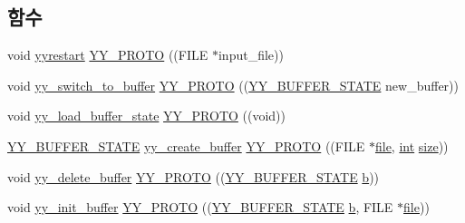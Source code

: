 \subsection*{함수}
\begin{DoxyCompactItemize}
\item 
void \mbox{\hyperlink{expr-lex_8cpp_a3528c58cdd338886f23357f42e2061b8}{yyrestart}} \mbox{\hyperlink{expr-lex_8cpp_ad0030daf8055c0afc233a0c34bc12fd6}{Y\+Y\+\_\+\+P\+R\+O\+TO}} ((F\+I\+LE $\ast$input\+\_\+file))
\item 
void \mbox{\hyperlink{expr-lex_8cpp_a01ffaab94c1633ad975eb2e5d5ca360c}{yy\+\_\+switch\+\_\+to\+\_\+buffer}} \mbox{\hyperlink{expr-lex_8cpp_aa4d8fcf388290ca0a2849fb6120b8bdb}{Y\+Y\+\_\+\+P\+R\+O\+TO}} ((\mbox{\hyperlink{expr-lex_8cpp_a4e5bd2d129903df83f3d13effaf8f3e4}{Y\+Y\+\_\+\+B\+U\+F\+F\+E\+R\+\_\+\+S\+T\+A\+TE}} new\+\_\+buffer))
\item 
void \mbox{\hyperlink{expr-lex_8cpp_a30fc8e518fa4e332a8657f6f8afa8fd9}{yy\+\_\+load\+\_\+buffer\+\_\+state}} \mbox{\hyperlink{expr-lex_8cpp_ad0c2268922fe79170ffa21498ef4f02d}{Y\+Y\+\_\+\+P\+R\+O\+TO}} ((void))
\item 
\mbox{\hyperlink{expr-lex_8cpp_a4e5bd2d129903df83f3d13effaf8f3e4}{Y\+Y\+\_\+\+B\+U\+F\+F\+E\+R\+\_\+\+S\+T\+A\+TE}} \mbox{\hyperlink{expr-lex_8cpp_a55588ac24161be2160e907e019dcae5c}{yy\+\_\+create\+\_\+buffer}} \mbox{\hyperlink{expr-lex_8cpp_aa2feac785a778f388f5789c00eccf8c3}{Y\+Y\+\_\+\+P\+R\+O\+TO}} ((F\+I\+LE $\ast$\mbox{\hyperlink{expr-lex_8cpp_a702945180aa732857b380a007a7e2a21}{file}}, \mbox{\hyperlink{_util_8cpp_a0ef32aa8672df19503a49fab2d0c8071}{int}} \mbox{\hyperlink{expr-lex_8cpp_ab7d671599a7b25ca99a487fa341bc33a}{size}}))
\item 
void \mbox{\hyperlink{expr-lex_8cpp_a05a39a25571bbcfcf45a1e04a8c24f9b}{yy\+\_\+delete\+\_\+buffer}} \mbox{\hyperlink{expr-lex_8cpp_af3396691b9b779b13d6cc623715bb1dd}{Y\+Y\+\_\+\+P\+R\+O\+TO}} ((\mbox{\hyperlink{expr-lex_8cpp_a4e5bd2d129903df83f3d13effaf8f3e4}{Y\+Y\+\_\+\+B\+U\+F\+F\+E\+R\+\_\+\+S\+T\+A\+TE}} \mbox{\hyperlink{expr-lex_8cpp_a91b64995742fd30063314f12340b4b5a}{b}}))
\item 
void \mbox{\hyperlink{expr-lex_8cpp_a1ae002281d6d54c4ca55d32b423662f9}{yy\+\_\+init\+\_\+buffer}} \mbox{\hyperlink{expr-lex_8cpp_adb439e9a28fc4c4ad50eff59cb513eba}{Y\+Y\+\_\+\+P\+R\+O\+TO}} ((\mbox{\hyperlink{expr-lex_8cpp_a4e5bd2d129903df83f3d13effaf8f3e4}{Y\+Y\+\_\+\+B\+U\+F\+F\+E\+R\+\_\+\+S\+T\+A\+TE}} \mbox{\hyperlink{expr-lex_8cpp_a91b64995742fd30063314f12340b4b5a}{b}}, F\+I\+LE $\ast$\mbox{\hyperlink{expr-lex_8cpp_a702945180aa732857b380a007a7e2a21}{file}}))

\end{DoxyCompactItemize}
